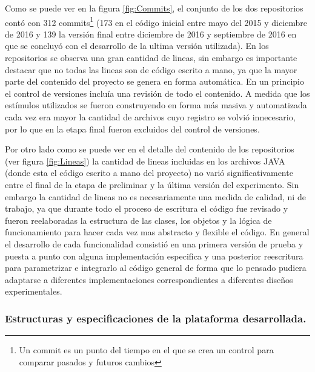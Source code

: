 \documentclass{article}
\numberwithin{figure}{section}
\begin{document}
    Como se puede ver en la figura \ref{fig:Commits}, el conjunto de los dos repositorios contó con 312 commits\footnote{Un commit es un punto del tiempo en el que se crea un control para comparar pasados y futuros cambios} (173 en el código inicial entre mayo del 2015 y diciembre de 2016 y 139 la versión final entre diciembre de 2016 y septiembre de 2016 en que se concluyó con el desarrollo de la ultima versión utilizada). En los repositorios se observa una gran cantidad de lineas, sin embargo es importante destacar que no todas las lineas son de código escrito a mano, ya que la mayor parte del contenido del proyecto se genera en forma automática. En un principio el control de versiones incluía una revisión de todo el contenido. A medida que los estímulos utilizados se fueron construyendo en forma más masiva y automatizada cada vez era mayor la cantidad de archivos cuyo registro se volvió innecesario, por lo que en la etapa final fueron excluidos del control de versiones. 
    
    Por otro lado como se puede ver en el detalle del contenido de los repositorios (ver figura \ref{fig:Lineas}) la cantidad de lineas incluidas en los archivos JAVA (donde esta el código escrito a mano del proyecto) no varió significativamente entre el final de la etapa de preliminar y la última versión del experimento. Sin embargo la cantidad de lineas no es necesariamente una medida de calidad, ni de trabajo, ya que durante todo el proceso de escritura el código fue revisado y fueron reelaboradas la estructura de las clases, los objetos y la lógica de funcionamiento para hacer cada vez mas abstracto y flexible el código. En general el desarrollo de cada funcionalidad consistió en una primera versión de prueba y puesta a punto con alguna implementación especifica y una posterior reescritura para parametrizar e integrarlo al código general de forma que lo pensado pudiera adaptarse a diferentes implementaciones correspondientes a diferentes diseños experimentales. 
    
    \subsubsection{Estructuras y especificaciones de la plataforma desarrollada.}
    
\end{document}
